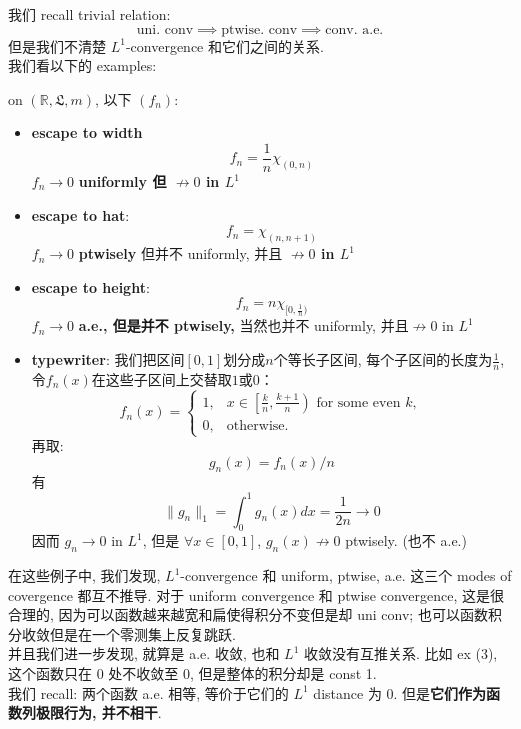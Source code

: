 \documentclass[lang=cn,11pt]{elegantbook}
\begin{document}
我们 recall trivial relation: \[
\text{uni. conv} \implies \text{ptwise. conv} \implies \text{conv. a.e.}
\]
但是我们不清楚 $L^1$-convergence 和它们之间的关系.\\
我们看以下的 examples: 
\begin{example}
    on $(\mathbb{R}, \mathfrak{L}, m)$, 以下 $(f_n)$:
    \begin{itemize}
        \item \textbf{escape to width }$$f_n = \frac{1}{n} \chi_{(0,n)}$$
        $f_n \rightarrow 0$\textbf{ uniformly 但 $\not\rightarrow 0$ in $L^1$}

        \item \textbf{escape to hat}: $$f_n = \chi_{(n,n+1)}$$
        $f_n \rightarrow 0$ \textbf{ptwisely} 但并不 uniformly, 并且\textbf{ $\not\rightarrow 0$ in $L^1$}

        \item \textbf{escape to height}: $$f_n = n \chi_{[0,\frac{1}{n})}$$
        $f_n \rightarrow 0$ \textbf{a.e., 但是并不 ptwisely,} 当然也并不 uniformly, 并且$\not\rightarrow 0$ in $L^1$
        
        \item \textbf{typewriter}: 我们把区间$[0,1]$划分成$n$个等长子区间, 每个子区间的长度为$\frac{1}{n}$, 令$f_n(x)$在这些子区间上交替取$1$或$0$：    
\[
   f_n(x) = 
   \begin{cases}
   1, & x \in \left[ \frac{k}{n}, \frac{k+1}{n} \right) \text{ for some even } k, \\
   0, & \text{otherwise}.
   \end{cases}
   \]
再取: \[
   g_n(x) = f_n(x) / n
   \]
有  \[
   \| g_n \|_1 = \int_0^1 g_n(x) dx = \frac{1}{2n} \to 0
   \] 因而 $g_n \rightarrow 0$ in $L^1$, 但是 $\forall x\in[0,1]$, $g_n(x)\not\rightarrow 0$ ptwisely. (也不 a.e.)
    \end{itemize}
\end{example}
在这些例子中, 我们发现, $L^1$-convergence 和 uniform, ptwise, a.e. 这三个 modes of covergence 都互不推导. 对于 uniform convergence 和 ptwise convergence, 这是很合理的, 因为可以函数越来越宽和扁使得积分不变但是却 uni conv; 也可以函数积分收敛但是在一个零测集上反复跳跃.\\

并且我们进一步发现, 就算是 a.e. 收敛, 也和 $L^1$ 收敛没有互推关系. 比如 ex (3), 这个函数只在 $0$ 处不收敛至 0, 但是整体的积分却是 const 1. \\
我们 recall: 两个函数 a.e. 相等, 等价于它们的 $L^1$ distance 为 0. 但是\textbf{它们作为函数列极限行为, 并不相干}.\\ 
\end{document}
